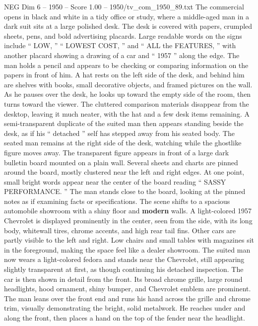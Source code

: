 \begin{textsample}{NEG Dim 6 – 1950 – Score 1.00 – 1950/tv\_com\_1950\_89.txt}  \label{ex:f6_neg_084}
The commercial opens in black and white in a tidy office or study, where a middle-aged man in a dark suit sits at a large polished desk.
The desk is covered with papers, crumpled sheets, pens, and bold advertising placards.
Large readable words on the signs include “ LOW, ” “ LOWEST COST, ” and “ ALL the FEATURES, ” with another placard showing a drawing of a car and “ 1957 ” along the edge.
The man holds a pencil and appears to be checking or comparing information on the papers in front of him.
A hat rests on the left side of the desk, and behind him are shelves with books, small decorative objects, and framed pictures on the wall.
As he pauses over the desk, he looks up toward the empty side of the room, then turns toward the viewer.
The cluttered comparison materials disappear from the desktop, leaving it much neater, with the hat and a few desk items remaining.
A semi-transparent duplicate of the suited man then appears standing beside the desk, as if his “ detached ” self has stepped away from his seated body.
The seated man remains at the right side of the desk, watching while the ghostlike figure moves away.
The transparent figure appears in front of a large dark bulletin board mounted on a plain wall.
Several sheets and charts are pinned around the board, mostly clustered near the left and right edges.
At one point, small bright words appear near the center of the board reading “ SASSY PERFORMANCE. ” The man stands close to the board, looking at the pinned notes as if examining facts or specifications.
The scene shifts to a spacious automobile showroom with a shiny floor and \textbf{modern} walls.
A light-colored 1957 Chevrolet is displayed prominently in the center, seen from the side, with its long body, whitewall tires, chrome accents, and high rear tail fins.
Other cars are partly visible to the left and right.
Low chairs and small tables with magazines sit in the foreground, making the space feel like a dealer showroom.
The suited man now wears a light-colored fedora and stands near the Chevrolet, still appearing slightly transparent at first, as though continuing his detached inspection.
The car is then shown in detail from the front.
Its broad chrome grille, large round headlights, hood ornament, shiny bumper, and Chevrolet emblem are prominent.
The man leans over the front end and runs his hand across the grille and chrome trim, visually demonstrating the bright, solid metalwork.
He reaches under and along the front, then places a hand on the top of the fender near the headlight.

\end{textsample}
